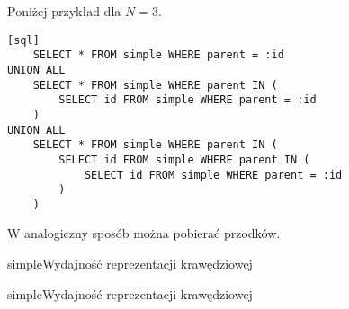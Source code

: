 Poniżej przykład dla $N = 3$.

\begin{verbatim}[sql]
    SELECT * FROM simple WHERE parent = :id
UNION ALL 
    SELECT * FROM simple WHERE parent IN (
        SELECT id FROM simple WHERE parent = :id
    )
UNION ALL
    SELECT * FROM simple WHERE parent IN (
        SELECT id FROM simple WHERE parent IN (
            SELECT id FROM simple WHERE parent = :id
        )
    )
\end{verbatim}

W analogiczny sposób można pobierać przodków.








%
%


\begin{qxtab}{simple}{Wydajność reprezentacji krawędziowej}
\end{qxtab}

\begin{qxfig}{simple}{Wydajność reprezentacji krawędziowej}
\end{qxfig}

